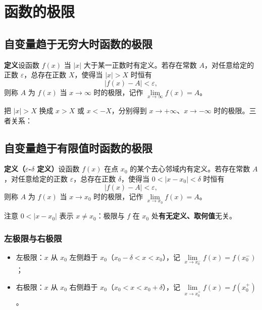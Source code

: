 
\section{函数的极限}

\subsection{自变量趋于无穷大时函数的极限}
\textbf{定义}\quad 设函数 $f(x)$ 当 $|x|$ 大于某一正数时有定义。若存在常数 $A$，对任意给定的正数 $\varepsilon$，总存在正数 $X$，使得当 $|x|>X$ 时恒有
\[
|f(x)-A|<\varepsilon,
\]
则称 $A$ 为 $f(x)$ 当 $x\to\infty$ 时的极限，记作 $\lim\limits_{x\to\infty}f(x)=A$。

把 $|x|>X$ 换成 $x>X$ 或 $x<-X$，分别得到 $x\to+\infty$、$x\to-\infty$ 时的极限。三者关系：


\subsection{自变量趋于有限值时函数的极限}
\textbf{定义（$\varepsilon$-$\delta$ 定义）}\quad 设函数 $f(x)$ 在点 $x_0$ 的某个去心邻域内有定义。若存在常数 $A$，对任意给定的正数 $\varepsilon$，总存在正数 $\delta$，使得当 $0<|x-x_0|<\delta$ 时恒有
\[
|f(x)-A|<\varepsilon,
\]
则称 $A$ 为 $f(x)$ 当 $x\to x_0$ 时的极限，记作 $\lim\limits_{x\to x_0}f(x)=A$。


\noindent 注意 $0<|x-x_0|$ 表示 $x\neq x_0$：极限与 $f$ 在 $x_0$ 处\textbf{有无定义、取何值}无关。

\subsubsection{左极限与右极限}
\begin{itemize}
    \item 左极限：$x$ 从 $x_0$ 左侧趋于 $x_0$（$x_0-\delta<x<x_0$），记 $\lim\limits_{x\to x_0^-}f(x)=f(x_0^-)$；
    \item 右极限：$x$ 从 $x_0$ 右侧趋于 $x_0$（$x_0<x<x_0+\delta$），记 $\lim\limits_{x\to x_0^+}f(x)=f(x_0^+)$。
\end{itemize}

